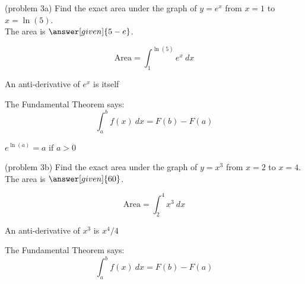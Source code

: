 \documentclass{ximera}
\begin{document}
\begin{problem}(problem 3a)
 Find the exact area under the graph of $y = e^x$ from $x=1$ to $x = \ln(5)$.\\
The area is $\answer[given]{5-e}$.
 \begin{hint}
 \[
 \text{Area} = \int_1^{\ln(5)} e^x \ dx 
  \]
  \end{hint}
    \begin{hint}
      An anti-derivative of $e^x$ is itself
    \end{hint}
    
    \begin{hint}
      The Fundamental Theorem says:
      \[
      \int_a^b f(x) \ dx = F(b) - F(a)
      \]
    \end{hint}   
		\begin{hint}
      $e^{\ln(a)} = a$ if $a > 0$
    \end{hint}
\end{problem}




\begin{problem}(problem 3b)
Find the exact area under the graph of $y = x^3$ from $x = 2$ to $x = 4$.\\
The area is $\answer[given]{60}$.
 \begin{hint}
 \[
  \text{Area}=\int_2^{4} x^3 \ dx
  \]
  \end{hint}
    \begin{hint}
      An anti-derivative of $x^3$ is $x^4 /4$
    \end{hint}
    \begin{hint}
      The Fundamental Theorem says:
      \[
      \int_a^b f(x) \ dx = F(b) - F(a)
      \]
    \end{hint}    
		
		
\end{problem}
\end{document}
